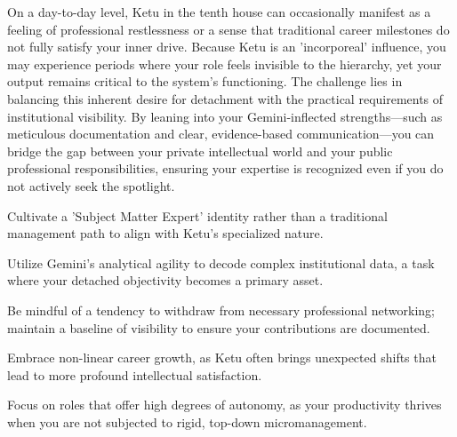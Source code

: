 {\fontsize{9}{13}\selectfont On a day-to-day level, Ketu in the tenth house can occasionally manifest as a feeling of professional restlessness or a sense that traditional career milestones do not fully satisfy your inner drive. Because Ketu is an 'incorporeal' influence, you may experience periods where your role feels invisible to the hierarchy, yet your output remains critical to the system's functioning. The challenge lies in balancing this inherent desire for detachment with the practical requirements of institutional visibility. By leaning into your Gemini-inflected strengths---such as meticulous documentation and clear, evidence-based communication---you can bridge the gap between your private intellectual world and your public professional responsibilities, ensuring your expertise is recognized even if you do not actively seek the spotlight.}\par\vspace{1.8mm}

\begin{diamondlist}
  \item {\fontsize{8.5}{12}\selectfont Cultivate a 'Subject Matter Expert' identity rather than a traditional management path to align with Ketu's specialized nature.}
  \item {\fontsize{8.5}{12}\selectfont Utilize Gemini's analytical agility to decode complex institutional data, a task where your detached objectivity becomes a primary asset.}
  \item {\fontsize{8.5}{12}\selectfont Be mindful of a tendency to withdraw from necessary professional networking; maintain a baseline of visibility to ensure your contributions are documented.}
  \item {\fontsize{8.5}{12}\selectfont Embrace non-linear career growth, as Ketu often brings unexpected shifts that lead to more profound intellectual satisfaction.}
  \item {\fontsize{8.5}{12}\selectfont Focus on roles that offer high degrees of autonomy, as your productivity thrives when you are not subjected to rigid, top-down micromanagement.}
\end{diamondlist}


\label{topic13}

